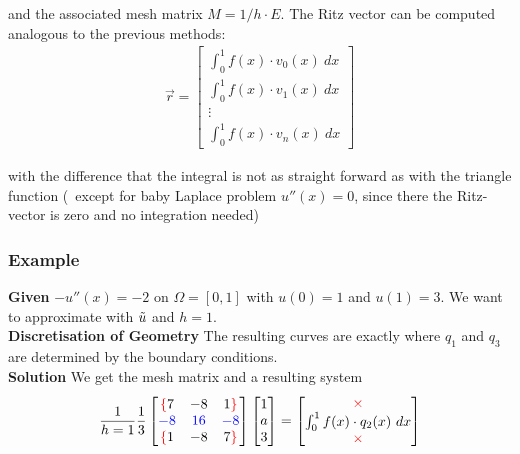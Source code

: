 and the associated mesh matrix $M = 1/h\cdot E$.
The Ritz vector can be computed analogous to the previous methods:
\begin{align*}
    \vec{r} = \begin{bmatrix}
        \int_0^1 f(x)\cdot v_0(x)\ dx \\
        \int_0^1 f(x)\cdot v_1(x)\ dx \\
        \vdots \\
        \int_0^1 f(x)\cdot v_n(x)\ dx
    \end{bmatrix}
\end{align*}

with the difference that the integral is not as straight forward as with the triangle function
({\color{blue}\faInfo}\ except for baby Laplace problem $u''(x) = 0$, since there the Ritz-vector is zero and no integration needed)

\subsubsection{Example}
\textbf{Given} $-u''(x) = -2$ on $\Omega = [0,1]$ with $u(0) = 1$ and $u(1) = 3$.
We want to approximate with $\tilde{u}$ and $h=1$.
\\[1em]
\textbf{Discretisation of Geometry}
The resulting curves are exactly
where $q_1$ and $q_3$ are determined by the boundary conditions.
\\[1em]
\textbf{Solution}
We get the mesh matrix and a resulting system
\begin{align*}
    \frac{1}{h=1}\frac{1}{3}
    \begin{bmatrix}
        {\color{red}\{}7 & -8 & 1{\color{red}\}} \\
        {\color{blue}-8} & {\color{blue}16} & {\color{blue}-8} \\
        {\color{red}\{}1 & -8 & 7 {\color{red}\}}
    \end{bmatrix}
    \begin{bmatrix}
        1 \\ a \\ 3
    \end{bmatrix}
    =
    \begin{bmatrix}
        {\color{red} \times} \\
        \int_0^1 f(x)\cdot q_2(x)\ dx \\
        {\color{red} \times}
    \end{bmatrix}
\end{align*}

